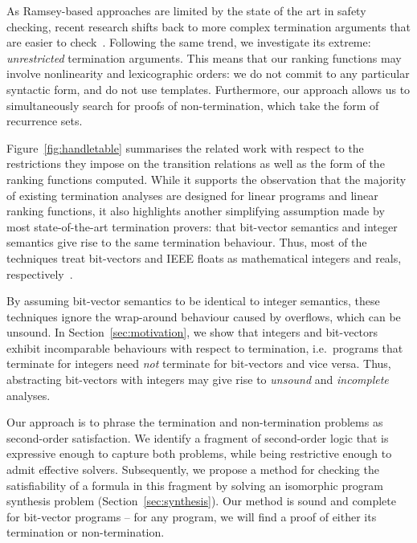 \documentclass[preprint]{sigplanconf}
\theoremstyle{definition}
\begin{document}
As Ramsey-based approaches are limited by the state of the art in safety
checking, recent research shifts back to more complex termination arguments
that are easier to
check~\cite{DBLP:conf/cav/KroeningSTW10,DBLP:conf/tacas/CookSZ13}. 
Following the same trend, we investigate its extreme: \emph{unrestricted}
termination arguments.  This means that our ranking functions may involve
nonlinearity and lexicographic orders: we do not commit to any particular
syntactic form, and do not use templates.  Furthermore, our approach allows
us to simultaneously search for proofs of non-termination, which take the form
of recurrence sets.

Figure~\ref{fig:handletable} summarises the related work with respect to the
restrictions they impose on the transition relations as well as the form of
the ranking functions computed.  While it supports the observation that the
majority of existing termination analyses are designed for linear programs
and linear ranking functions, it also highlights another simplifying
assumption made by most state-of-the-art termination provers: that
bit-vector semantics and integer semantics give rise to the same termination
behaviour.  Thus, most of the techniques treat bit-vectors and IEEE floats
as mathematical integers and reals,
respectively~\cite{DBLP:conf/pldi/CookPR06,DBLP:conf/popl/Ben-AmramG13,DBLP:conf/vmcai/P04,DBLP:conf/atva/HeizmannHLP13,DBLP:conf/vmcai/BradleyMS05,DBLP:conf/cav/KroeningSTW10}.

By assuming bit-vector semantics to be identical to integer semantics, these
techniques ignore the wrap-around behaviour caused by overflows, which can
be unsound.  In Section~\ref{sec:motivation}, we show that integers and
bit-vectors exhibit incomparable behaviours with respect to termination,
i.e.~programs that terminate for integers need \emph{not} terminate for
bit-vectors and vice versa.  Thus, abstracting bit-vectors with integers may
give rise to {\em unsound} and {\em incomplete} analyses.



Our approach is to phrase the termination and non-termination problems as
second-order satisfaction.  We identify a fragment of second-order
logic that is expressive enough to capture both problems, while being
restrictive enough to admit effective solvers.  Subsequently, we propose a method for
checking the satisfiability of a formula in this fragment by
solving an isomorphic program synthesis problem
(Section~\ref{sec:synthesis}).  Our method is sound and
complete for bit-vector programs -- for any program, we will find
a proof of either its termination or non-termination.
\end{document}
